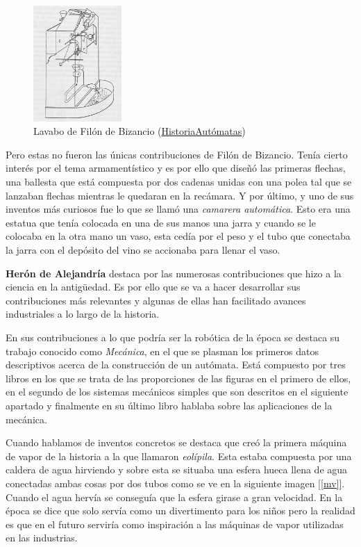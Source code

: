 \begin{figure}[H]
\begin{center}
  \includegraphics[width=0.3\textwidth]{./EtapaPrimeriza/imagenes/lavabo.jpg}
  \caption{Lavabo de Filón de Bizancio (\href{http://historiautomatas.blogspot.com/2010/06/grecia-ii-filon-de-bizancio.html} {HistoriaAutómatas})}
  \label{lavabo}
\end{center}
\end{figure}

Pero estas no fueron las únicas contribuciones de Filón de Bizancio. Tenía cierto interés por el tema armamentístico y es por ello que diseñó las primeras flechas, una ballesta que está compuesta por dos cadenas unidas con una polea tal que se lanzaban flechas mientras le quedaran en la recámara. Y por último, y uno de sus inventos más curiosos fue lo que se llamó una \textit{camarera automática}. Esto era una estatua que tenía colocada en una de sus manos una jarra y cuando se le colocaba en la otra mano un vaso, esta cedía por el peso y el tubo que conectaba la jarra con el depósito del vino se accionaba para llenar el vaso.



\textbf{Herón de Alejandría} destaca por las numerosas contribuciones que hizo a la ciencia en la antigüedad. Es por ello que se va a hacer desarrollar sus contribuciones más relevantes y algunas de ellas han facilitado avances industriales a lo largo de la historia.

En sus contribuciones a lo que podría ser la robótica de la época se destaca su trabajo conocido como \textit{Mecánica}, en el que se plasman los primeros datos descriptivos acerca de la construcción de un autómata. Está compuesto por tres libros en los que se trata de las proporciones de las figuras en el primero de ellos, en el segundo de los sistemas mecánicos simples que son descritos en el siguiente apartado y finalmente en su último libro hablaba sobre las aplicaciones de la mecánica.

Cuando hablamos de inventos concretos se destaca que creó la primera máquina de vapor de la historia a la que llamaron \textit{eolípila}. Esta estaba compuesta por una caldera de agua hirviendo y sobre esta se situaba una esfera hueca llena de agua conectadas ambas cosas por dos tubos como se ve en la siguiente imagen [\ref{mv}]. Cuando el agua hervía se conseguía que la esfera girase a gran velocidad. En la época se dice que solo servía como un divertimento para los niños pero la realidad es que en el futuro serviría como inspiración a las máquinas de vapor utilizadas en las industrias.

